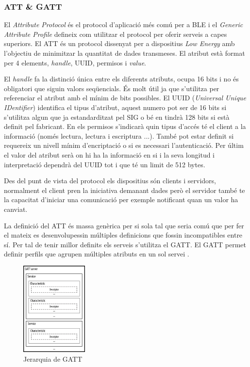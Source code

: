 \subsubsection{ATT \& GATT}
El \textit{Attribute Protocol} és el protocol d'aplicació més comú per a BLE i el \textit{Generic Attribute Profile} defineix com utilitzar el protocol per oferir serveis a capes superiors.
El ATT és un protocol dissenyat per a dispositius \textit{Low Energy} amb l'objectiu de minimitzar la quantitat de dades transmeses. El atribut està format per 4 elements, \textit{handle}, UUID, permisos  i \textit{value}.

El \textit{handle} fa la distinció única entre els diferents atributs, ocupa 16 bits i no és obligatori que siguin valors seqüencials. És molt útil ja que s'utilitza per referenciar el atribut amb el mínim de bits possibles.
El UUID (\textit{Universal Unique IDentifier}) identifica el tipus d'atribut, aquest numero pot ser de 16 bits si s'utilitza algun que ja estandarditzat pel SIG o bé en tindrà 128 bits si està definit pel fabricant.
En els permisos s'indicarà quin tipus d'accés té el client a la informació (només lectura, lectura i escriptura ...). També pot estar definit si requereix un nivell mínim d'encriptació o si es necessari l'autenticació.
Per últim el valor del atribut serà on hi ha la informació en si i la seva longitud i interpretació dependrà del UUID tot i que té un limit de 512 bytes.

Des del punt de vista del protocol els dispositius són clients i servidors, normalment el client pren la iniciativa demanant dades però el servidor també te la capacitat d'iniciar una comunicació per exemple notificant quan un valor ha canviat.

La definició del ATT és massa genèrica per si sola tal que seria comú que per fer el mateix es desenvolupessin múltiples definicions que fossin incompatibles entre sí.
Per tal de tenir millor definits els serveis s'utilitza el GATT. El GATT permet definir perfils que agrupen múltiples atributs en un sol servei \cite{services}.

\begin{figure}[h!]
	\begin{center}
		\includegraphics[width=0.3\textwidth]{./images/GATT_Hierarchy.png}
		\caption{Jerarquia de GATT \cite{GATT_Hierarchy}}
	\end{center}
\end{figure}

